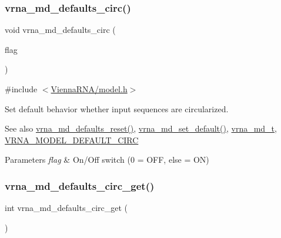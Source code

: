 \subsubsection{\texorpdfstring{vrna\+\_\+md\+\_\+defaults\+\_\+circ()}{vrna\_md\_defaults\_circ()}}
{\footnotesize\ttfamily void vrna\+\_\+md\+\_\+defaults\+\_\+circ (\begin{DoxyParamCaption}\item[{int}]{flag }\end{DoxyParamCaption})}



{\ttfamily \#include $<$\mbox{\hyperlink{model_8h}{Vienna\+R\+N\+A/model.\+h}}$>$}



Set default behavior whether input sequences are circularized. 

\begin{DoxySeeAlso}{See also}
\mbox{\hyperlink{group__model__details_ga70834424cf804d149937de89f80ceb45}{vrna\+\_\+md\+\_\+defaults\+\_\+reset()}}, \mbox{\hyperlink{group__model__details_ga8ac6ff84936282436f822644bf841f66}{vrna\+\_\+md\+\_\+set\+\_\+default()}}, \mbox{\hyperlink{group__model__details_ga1f8a10e12a0a1915f2a4eff0b28ea17c}{vrna\+\_\+md\+\_\+t}}, \mbox{\hyperlink{group__model__details_ga22059033db7bcd875c51fec32425490a}{V\+R\+N\+A\+\_\+\+M\+O\+D\+E\+L\+\_\+\+D\+E\+F\+A\+U\+L\+T\+\_\+\+C\+I\+RC}} 
\end{DoxySeeAlso}

\begin{DoxyParams}{Parameters}
{\em flag} & On/\+Off switch (0 = O\+FF, else = ON) \\
\hline
\end{DoxyParams}
\mbox{\label{group__model__details_gad3a7e58de344ad93a08925f58f94f6fb}} 
\subsubsection{\texorpdfstring{vrna\+\_\+md\+\_\+defaults\+\_\+circ\+\_\+get()}{vrna\_md\_defaults\_circ\_get()}}
{\footnotesize\ttfamily int vrna\+\_\+md\+\_\+defaults\+\_\+circ\+\_\+get (\begin{DoxyParamCaption}\item[{void}]{ }\end{DoxyParamCaption})}



